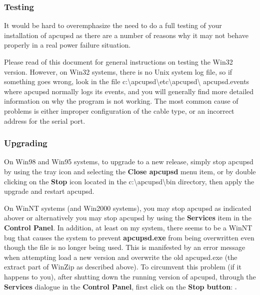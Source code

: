 {{{{{{{{{{\subsubsection*{Testing}

\label{index-Windows_002c-Testing-173}
\label{index-Testing_002c-Windows-174}
It would be hard to overemphasize the need to do a full testing of your
installation of apcupsd as there are a number of reasons why it may not behave
properly in a real power failure situation.  

Please read 
 of this document for
general instructions on testing the Win32 version. However, on Win32 systems,
there is no Unix system log file, so if something goes wrong, look in the file
c:\textbackslash{}apcupsd\textbackslash{}etc\textbackslash{}apcupsd\textbackslash
{}apcupsd.events where apcupsd normally logs its events, and you will
generally find more detailed information on why the program is not working.
The most common cause of problems is either improper configuration of the
cable type, or an incorrect address for the serial port. 

\label{Upgrading}

\subsubsection*{Upgrading}

\label{index-Windows_002c-Upgrading-175}
\label{index-Upgrading-Windows-176}
On Win98 and Win95 systems, to upgrade to a new release, simply stop apcupsd
by using the tray icon and selecting the {\bf Close apcupsd} menu item, or by
double clicking on the {\bf Stop} icon located in the
c:\textbackslash{}apcupsd\textbackslash{}bin directory, then apply the upgrade
and restart apcupsd.  

On WinNT systems (and Win2000 systems), you may stop apcupsd as indicated
abover or alternatively you may stop apcupsd by using the {\bf Services} item
in the {\bf Control Panel}. In addition, at least on my system, there seems to
be a WinNT bug that causes the system to prevent {\bf apcupsd.exe} from being
overwritten even though the file is no longer being used.  This is manifested
by an error message when attempting load a new version and overwrite the old
apcupsd.exe (the extract part of WinZip as described above). To circumvent
this problem (if it happens to you), after shutting down the running version
of apcupsd, through the {\bf Services} dialogue in the {\bf Control Panel},
first click on the {\bf Stop button}:  \includegraphics{./wininstall6.eps}  

}}}}}}}}}}
